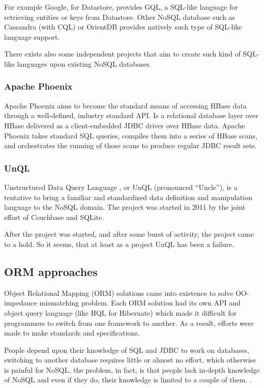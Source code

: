 \noindent For example Google, for Datastore, provides GQL, a SQL-like language for retrieving entities or keys from Datastore.
Other NoSQL database such as Cassandra (with CQL) or OrientDB provides natively such type of SQL-like language support.

\newparagraph There exists also some independent projects that aim to create such kind of SQL-like languages upon existing NoSQL databases.

\subsubsection{Apache Phoenix} 
Apache Phoenix \cite{online:apache-phoenix} aims to become the standard means of accessing HBase data through a well-defined, industry standard API.
Is a relational database layer over HBase delivered as a client-embedded JDBC driver over HBase data. Apache Phoenix takes standard SQL queries, compiles them into a series of HBase scans, and orchestrates the running of those scans to produce regular JDBC result sets. 

\subsubsection{UnQL}  
Unstructured Data Query Language \cite{online:unql}, or UnQL (pronounced “Uncle”), is a tentative to bring a familiar and standardized data definition and manipulation language to the NoSQL domain. The project was started in 2011 by the joint effort of Couchbase and SQLite.

\noindent After the project was started, and after some burst of activity, the project came to a hold. So it seems, that at least as a project UnQL has been a failure. 

\subsection{ORM approaches}
Object Relational Mapping (ORM) solutions came into existence to solve OO-impedance mismatching problem. Each ORM solution had its own API and object query language (like HQL for Hibernate) which made it difficult for programmers to switch from one framework to another. As a result, efforts were made to make standards and specifications. 

\noindent People depend upon their knowledge of SQL and JDBC to work on databases, switching to another database requires little or almost no effort, which otherwise is painful for NoSQL, the problem, in fact, is that people lack in-depth knowledge of NoSQL and even if they do, their knowledge is limited to a couple of them. .

